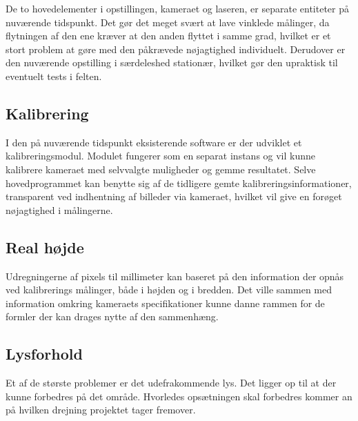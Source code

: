 De to hovedelementer i opstillingen, kameraet og laseren, er separate entiteter på nuværende tidspunkt. Det gør det meget svært at lave vinklede målinger, da flytningen af den ene kræver at den anden flyttet i samme grad, hvilket er et stort problem at gøre med den påkrævede nøjagtighed individuelt. Derudover er den nuværende opstilling i særdeleshed stationær, hvilket gør den upraktisk til eventuelt tests i felten.

\subsection{Kalibrering}

I den på nuværende tidspunkt eksisterende software er der udviklet et kalibreringsmodul. Modulet fungerer som en separat instans og vil kunne kalibrere kameraet med selvvalgte muligheder og gemme resultatet.
Selve hovedprogrammet kan benytte sig af de tidligere gemte kalibreringsinformationer, transparent ved indhentning af billeder via kameraet, hvilket vil give en forøget nøjagtighed i målingerne.

\subsection{Real højde}

Udregningerne af pixels til millimeter kan baseret på den information der opnås ved kalibrerings målinger, både i højden og i bredden. Det ville sammen med information omkring kameraets specifikationer kunne danne rammen for de formler der kan drages nytte af den sammenhæng.

\subsection{Lysforhold}

Et af de største problemer er det udefrakommende lys. Det ligger op til at der kunne forbedres på det område. Hvorledes opsætningen skal forbedres kommer an på hvilken drejning projektet tager fremover.

